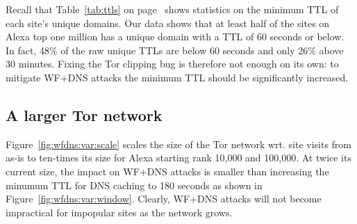 Recall that Table~\ref{tab:ttls} on page~\pageref{tab:ttls} shows statistics on
the minimum TTL of each site's unique domains. Our data shows that at least
half of the sites on Alexa top one million has a unique domain with a TTL of
60 seconds or below.
In fact, 48\% of the raw unique TTLs are below 60 seconds and only
26\% above 30 minutes. Fixing the Tor clipping bug is therefore not enough on
its own: to mitigate WF+DNS attacks the minimum TTL should be significantly
increased.

\subsection{A larger Tor network}
Figure~\ref{fig:wfdns:var:scale} scales the size of the Tor network wrt. site
visits from as-is to ten-times its size for Alexa starting rank 10,000 and
100,000. At twice its current size, the impact on WF+DNS attacks is smaller than
increasing the minumum TTL for DNS caching to 180 seconds as shown in
Figure~\ref{fig:wfdns:var:window}. Clearly, WF+DNS attacks will not become
impractical for impopular sites as the network grows.

